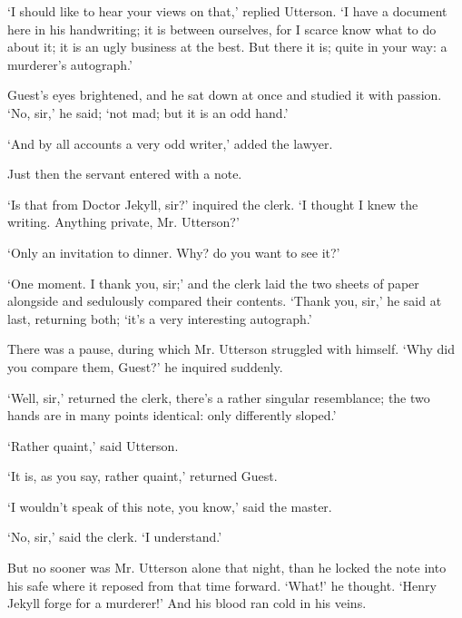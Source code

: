\documentclass[]{novel}
\begin{document}
‘I should like to hear your views on that,’ replied Utterson. ‘I have a document here in his handwriting; it is between ourselves, for I scarce know what to do about it; it is an ugly business at the best. But there it is; quite in your way: a murderer’s autograph.’

Guest’s eyes brightened, and he sat down at once and studied it with passion. ‘No, sir,’ he said; ‘not mad; but it is an odd hand.’

‘And by all accounts a very odd writer,’ added the lawyer.

Just then the servant entered with a note.

‘Is that from Doctor Jekyll, sir?’ inquired the clerk. ‘I thought I knew the writing. Anything private, Mr. Utterson?’

‘Only an invitation to dinner. Why? do you want to see it?’

‘One moment. I thank you, sir;’ and the clerk laid the two sheets of paper alongside and sedulously compared their contents. ‘Thank you, sir,’ he said at last, returning both; ‘it’s a very interesting autograph.’

There was a pause, during which Mr. Utterson struggled with himself. ‘Why did you compare them, Guest?’ he inquired suddenly.

‘Well, sir,’ returned the clerk, there’s a rather singular resemblance; the two hands are in many points identical: only differently sloped.’

‘Rather quaint,’ said Utterson.

‘It is, as you say, rather quaint,’ returned Guest.

‘I wouldn’t speak of this note, you know,’ said the master.

‘No, sir,’ said the clerk. ‘I understand.’

But no sooner was Mr. Utterson alone that night, than he locked the note into his safe where it reposed from that time forward. ‘What!’ he thought. ‘Henry Jekyll forge for a murderer!’ And his blood ran cold in his veins.

\clearpage
\label{ch:06}
\begin{ChapterStart}
\vspace*{4\nbs}
\null\vspace{0.75\nbs}
\vspace{0.375\nbs}
\end{ChapterStart}
\end{document}
